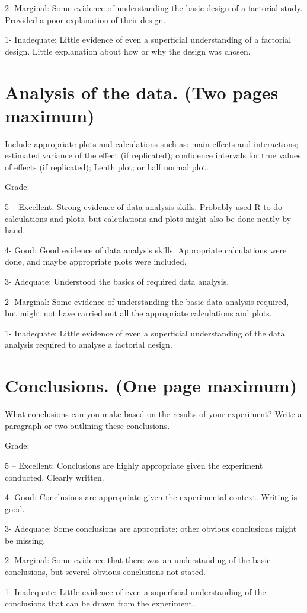 \documentclass[]{article}
\begin{document}
2- Marginal: Some evidence of understanding the basic design of a
factorial study. Provided a poor explanation of their design.

1- Inadequate: Little evidence of even a superficial understanding of a
factorial design. Little explanation about how or why the design was
chosen.

\section{Analysis of the data. (Two pages
maximum)}\label{analysis-of-the-data.-two-pages-maximum}

Include appropriate plots and calculations such as: main effects and
interactions; estimated variance of the effect (if replicated);
confidence intervals for true values of effects (if replicated); Lenth
plot; or half normal plot.

Grade:

5 -- Excellent: Strong evidence of data analysis skills. Probably used R
to do calculations and plots, but calculations and plots might also be
done neatly by hand.

4- Good: Good evidence of data analysis skills. Appropriate calculations
were done, and maybe appropriate plots were included.

3- Adequate: Understood the basics of required data analysis.

2- Marginal: Some evidence of understanding the basic data analysis
required, but might not have carried out all the appropriate
calculations and plots.

1- Inadequate: Little evidence of even a superficial understanding of
the data analysis required to analyse a factorial design.

\section{Conclusions. (One page
maximum)}\label{conclusions.-one-page-maximum}

What conclusions can you make based on the results of your experiment?
Write a paragraph or two outlining these conclusions.

Grade:

5 -- Excellent: Conclusions are highly appropriate given the experiment
conducted. Clearly written.

4- Good: Conclusions are appropriate given the experimental context.
Writing is good.

3- Adequate: Some conclusions are appropriate; other obvious conclusions
might be missing.

2- Marginal: Some evidence that there was an understanding of the basic
conclusions, but several obvious conclusions not stated.

1- Inadequate: Little evidence of even a superficial understanding of
the conclusions that can be drawn from the experiment.
\end{document}
